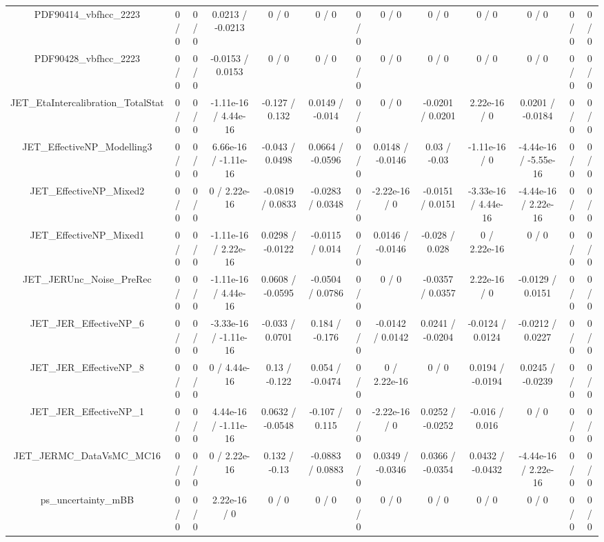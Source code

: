 \documentclass[10pt]{article}
\begin{document}
\begin{table}[htbp]
\begin{center}
\begin{tabular}{|c|c|c|c|c|c|c|c|c|c|c|c|c|}
  PDF90414_vbfhcc_2223 & 0 / 0 & 0 / 0 & 0.0213 / -0.0213 & 0 / 0 & 0 / 0 & 0 / 0 & 0 / 0 & 0 / 0 & 0 / 0 & 0 / 0 & 0 / 0 & 0 / 0 \\ 
  PDF90428_vbfhcc_2223 & 0 / 0 & 0 / 0 & -0.0153 / 0.0153 & 0 / 0 & 0 / 0 & 0 / 0 & 0 / 0 & 0 / 0 & 0 / 0 & 0 / 0 & 0 / 0 & 0 / 0 \\ 
  JET_EtaIntercalibration_TotalStat & 0 / 0 & 0 / 0 & -1.11e-16 / 4.44e-16 & -0.127 / 0.132 & 0.0149 / -0.014 & 0 / 0 & 0 / 0 & -0.0201 / 0.0201 & 2.22e-16 / 0 & 0.0201 / -0.0184 & 0 / 0 & 0 / 0 \\ 
  JET_EffectiveNP_Modelling3 & 0 / 0 & 0 / 0 & 6.66e-16 / -1.11e-16 & -0.043 / 0.0498 & 0.0664 / -0.0596 & 0 / 0 & 0.0148 / -0.0146 & 0.03 / -0.03 & -1.11e-16 / 0 & -4.44e-16 / -5.55e-16 & 0 / 0 & 0 / 0 \\ 
  JET_EffectiveNP_Mixed2 & 0 / 0 & 0 / 0 & 0 / 2.22e-16 & -0.0819 / 0.0833 & -0.0283 / 0.0348 & 0 / 0 & -2.22e-16 / 0 & -0.0151 / 0.0151 & -3.33e-16 / 4.44e-16 & -4.44e-16 / 2.22e-16 & 0 / 0 & 0 / 0 \\ 
  JET_EffectiveNP_Mixed1 & 0 / 0 & 0 / 0 & -1.11e-16 / 2.22e-16 & 0.0298 / -0.0122 & -0.0115 / 0.014 & 0 / 0 & 0.0146 / -0.0146 & -0.028 / 0.028 & 0 / 2.22e-16 & 0 / 0 & 0 / 0 & 0 / 0 \\ 
  JET_JERUnc_Noise_PreRec & 0 / 0 & 0 / 0 & -1.11e-16 / 4.44e-16 & 0.0608 / -0.0595 & -0.0504 / 0.0786 & 0 / 0 & 0 / 0 & -0.0357 / 0.0357 & 2.22e-16 / 0 & -0.0129 / 0.0151 & 0 / 0 & 0 / 0 \\ 
  JET_JER_EffectiveNP_6 & 0 / 0 & 0 / 0 & -3.33e-16 / -1.11e-16 & -0.033 / 0.0701 & 0.184 / -0.176 & 0 / 0 & -0.0142 / 0.0142 & 0.0241 / -0.0204 & -0.0124 / 0.0124 & -0.0212 / 0.0227 & 0 / 0 & 0 / 0 \\ 
  JET_JER_EffectiveNP_8 & 0 / 0 & 0 / 0 & 0 / 4.44e-16 & 0.13 / -0.122 & 0.054 / -0.0474 & 0 / 0 & 0 / 2.22e-16 & 0 / 0 & 0.0194 / -0.0194 & 0.0245 / -0.0239 & 0 / 0 & 0 / 0 \\ 
  JET_JER_EffectiveNP_1 & 0 / 0 & 0 / 0 & 4.44e-16 / -1.11e-16 & 0.0632 / -0.0548 & -0.107 / 0.115 & 0 / 0 & -2.22e-16 / 0 & 0.0252 / -0.0252 & -0.016 / 0.016 & 0 / 0 & 0 / 0 & 0 / 0 \\ 
  JET_JERMC_DataVsMC_MC16 & 0 / 0 & 0 / 0 & 0 / 2.22e-16 & 0.132 / -0.13 & -0.0883 / 0.0883 & 0 / 0 & 0.0349 / -0.0346 & 0.0366 / -0.0354 & 0.0432 / -0.0432 & -4.44e-16 / 2.22e-16 & 0 / 0 & 0 / 0 \\ 
  ps_uncertainty_mBB & 0 / 0 & 0 / 0 & 2.22e-16 / 0 & 0 / 0 & 0 / 0 & 0 / 0 & 0 / 0 & 0 / 0 & 0 / 0 & 0 / 0 & 0 / 0 & 0 / 0 \\ 

\end{tabular}
\end{center}
\end{table}
\end{document}
